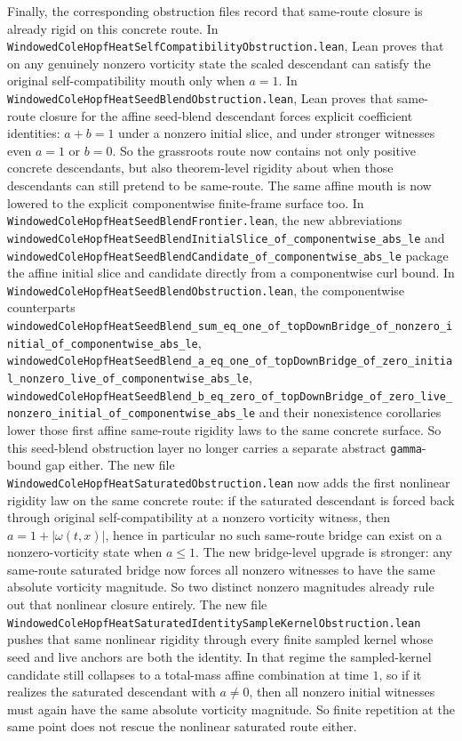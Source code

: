 \documentclass[11pt]{article}
\theoremstyle{remark}
\begin{document}
Finally, the corresponding obstruction files record that same-route closure is
already rigid on this concrete route.  In
\texttt{WindowedColeHopfHeatSelfCompatibilityObstruction.lean}, Lean proves that
on any genuinely nonzero vorticity state the scaled descendant can satisfy the
original self-compatibility mouth only when \(a=1\).  In
\texttt{WindowedColeHopfHeatSeedBlendObstruction.lean}, Lean proves that
same-route closure for the affine seed-blend descendant forces explicit
coefficient identities: \(a+b=1\) under a nonzero initial slice, and under
stronger witnesses even \(a=1\) or \(b=0\).  So the grassroots route now
contains not only positive concrete descendants, but also theorem-level
rigidity about when those descendants can still pretend to be same-route.  The
same affine mouth is now lowered to the explicit componentwise finite-frame
surface too.  In
\texttt{WindowedColeHopfHeatSeedBlendFrontier.lean}, the new abbreviations
\texttt{windowedColeHopfHeatSeedBlendInitialSlice\_of\_componentwise\_abs\_le}
and
\texttt{windowedColeHopfHeatSeedBlendCandidate\_of\_componentwise\_abs\_le}
package the affine initial slice and candidate directly from a componentwise
curl bound.  In
\texttt{WindowedColeHopfHeatSeedBlendObstruction.lean}, the componentwise
counterparts
\texttt{windowedColeHopfHeatSeedBlend\_sum\_eq\_one\_of\_topDownBridge\_of\_nonzero\_initial\_of\_componentwise\_abs\_le},
\texttt{windowedColeHopfHeatSeedBlend\_a\_eq\_one\_of\_topDownBridge\_of\_zero\_initial\_nonzero\_live\_of\_componentwise\_abs\_le},
\texttt{windowedColeHopfHeatSeedBlend\_b\_eq\_zero\_of\_topDownBridge\_of\_zero\_live\_nonzero\_initial\_of\_componentwise\_abs\_le}
and their nonexistence corollaries lower those first affine same-route
rigidity laws to the same concrete surface.  So this seed-blend obstruction
layer no longer carries a separate abstract \texttt{gamma}-bound gap either.
The
new file
\texttt{WindowedColeHopfHeatSaturatedObstruction.lean} now adds the first
nonlinear rigidity law on the same concrete route: if the saturated descendant
is forced back through original self-compatibility at a nonzero vorticity
witness, then \(a = 1 + |\omega(t,x)|\), hence in particular no such same-route
bridge can exist on a nonzero-vorticity state when \(a \le 1\).  The new
bridge-level upgrade is stronger: any same-route saturated bridge now forces
all nonzero witnesses to have the same absolute vorticity magnitude.  So two
distinct nonzero magnitudes already rule out that nonlinear closure entirely.
The new file
\texttt{WindowedColeHopfHeatSaturatedIdentitySampleKernelObstruction.lean}
pushes that same nonlinear rigidity through every finite sampled kernel whose
seed and live anchors are both the identity.  In that regime the sampled-kernel
candidate still collapses to a total-mass affine combination at time \(1\), so
if it realizes the saturated descendant with \(a \neq 0\), then all nonzero
initial witnesses must again have the same absolute vorticity magnitude.  So
finite repetition at the same point does not rescue the nonlinear saturated
route either.
\end{document}
